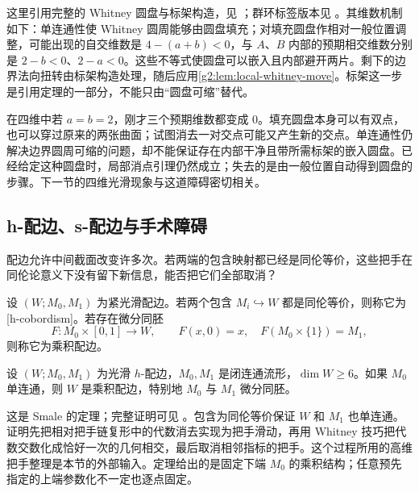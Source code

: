 这里引用完整的 Whitney 圆盘与标架构造，见 \cite[定理6.6及引理6.7]{Milnor1965HCobordism}；群环标签版本见 \cite[第7.3节]{Ranicki2002Surgery}。其维数机制如下：单连通性使 Whitney 圆周能够由圆盘填充；对填充圆盘作相对一般位置调整，可能出现的自交维数是 \(4-(a+b)<0\)，与 \(A\)、\(B\) 内部的预期相交维数分别是 \(2-b<0\)、\(2-a<0\)。这些不等式使圆盘可以嵌入且内部避开两片。剩下的边界法向扭转由标架构造处理，随后应用\cref{g2:lem:local-whitney-move}。标架这一步是引用定理的一部分，不能只由“圆盘可缩”替代。

\ProseParagraphBreak

在四维中若 \(a=b=2\)，刚才三个预期维数都变成 \(0\)。填充圆盘本身可以有双点，也可以穿过原来的两张曲面；试图消去一对交点可能又产生新的交点。单连通性仍解决边界圆周可缩的问题，却不能保证存在内部干净且带所需标架的嵌入圆盘。已经给定这种圆盘时，局部消点引理仍然成立；失去的是由一般位置自动得到圆盘的步骤。下一节的四维光滑现象与这道障碍密切相关。

\subsection{h-配边、s-配边与手术障碍}
\label{g2:subsec:2303:04}
配边允许中间截面改变许多次。若两端的包含映射都已经是同伦等价，这些把手在同伦论意义下没有留下新信息，能否把它们全部取消？

\begin{definition}\label{g2:def:h-cobordism}
	设 \((W;M_0,M_1)\) 为紧光滑配边。若两个包含 \(M_i\hookrightarrow W\) 都是同伦等价，则称它为[h-cobordism]。若存在微分同胚
	\[
		F:M_0\times[0,1]\longrightarrow W,
		\qquad F(x,0)=x,\quad F(M_0\times\{1\})=M_1,
	\]
	则称它为乘积配边。
\end{definition}

\begin{theorem}[\(h\)-配边定理]\label{g2:thm:h-cobordism}
	设 \((W;M_0,M_1)\) 为光滑 \(h\)-配边，\(M_0,M_1\) 是闭连通流形，\(\dim W\ge6\)。如果 \(M_0\) 单连通，则 \(W\) 是乘积配边，特别地 \(M_0\) 与 \(M_1\) 微分同胚。
\end{theorem}

这是 Smale 的定理；完整证明可见 \cite[第6--9节，定理9.1]{Milnor1965HCobordism}。包含为同伦等价保证 \(W\) 和 \(M_1\) 也单连通。证明先把相对把手链复形中的代数消去实现为把手滑动，再用 Whitney 技巧把代数交数化成恰好一次的几何相交，最后取消相邻指标的把手。这个过程所用的高维把手整理是本节的外部输入。定理给出的是固定下端 \(M_0\) 的乘积结构；任意预先指定的上端参数化不一定也逐点固定。

